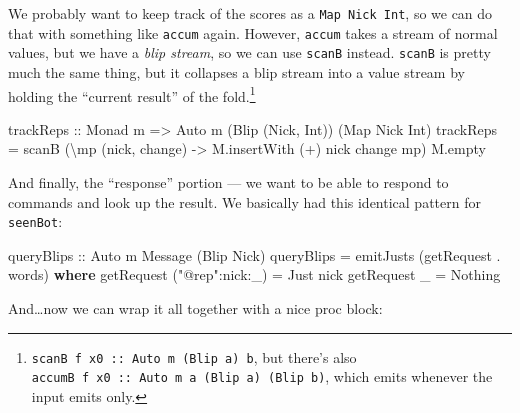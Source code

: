 \documentclass[]{article}
\newenvironment{Shaded}{\begin{snugshade}}{\end{snugshade}}
\newcommand{\DataTypeTok}[1]{\textcolor[rgb]{0.13,0.29,0.53}{#1}}
\newcommand{\FunctionTok}[1]{\textcolor[rgb]{0.00,0.00,0.00}{#1}}
\newcommand{\KeywordTok}[1]{\textcolor[rgb]{0.13,0.29,0.53}{\textbf{#1}}}
\newcommand{\NormalTok}[1]{#1}
\newcommand{\OtherTok}[1]{\textcolor[rgb]{0.56,0.35,0.01}{#1}}
\newcommand{\StringTok}[1]{\textcolor[rgb]{0.31,0.60,0.02}{#1}}
\begin{document}
We probably want to keep track of the scores as a \texttt{Map\ Nick\ Int}, so we
can do that with something like \texttt{accum} again. However, \texttt{accum}
takes a stream of normal values, but we have a \emph{blip stream}, so we can use
\texttt{scanB} instead. \texttt{scanB} is pretty much the same thing, but it
collapses a blip stream into a value stream by holding the ``current result'' of
the fold.\footnote{\texttt{scanB\ f\ x0\ ::\ Auto\ m\ (Blip\ a)\ b}, but there's
  also \texttt{accumB\ f\ x0\ ::\ Auto\ m\ a\ (Blip\ a)\ (Blip\ b)}, which emits
  whenever the input emits only.}

\begin{Shaded}
\begin{Highlighting}[]
\OtherTok{trackReps ::} \DataTypeTok{Monad}\NormalTok{ m }\OtherTok{=>} \DataTypeTok{Auto}\NormalTok{ m (}\DataTypeTok{Blip}\NormalTok{ (}\DataTypeTok{Nick}\NormalTok{, }\DataTypeTok{Int}\NormalTok{)) (}\DataTypeTok{Map} \DataTypeTok{Nick} \DataTypeTok{Int}\NormalTok{)}
\NormalTok{trackReps }\FunctionTok{=}\NormalTok{ scanB (\textbackslash{}mp (nick, change) }\OtherTok{->}\NormalTok{ M.insertWith (}\FunctionTok{+}\NormalTok{) nick change mp) M.empty}
\end{Highlighting}
\end{Shaded}

And finally, the ``response'' portion --- we want to be able to respond to
commands and look up the result. We basically had this identical pattern for
\texttt{seenBot}:

\begin{Shaded}
\begin{Highlighting}[]
\OtherTok{queryBlips ::} \DataTypeTok{Auto}\NormalTok{ m }\DataTypeTok{Message}\NormalTok{ (}\DataTypeTok{Blip} \DataTypeTok{Nick}\NormalTok{)}
\NormalTok{queryBlips }\FunctionTok{=}\NormalTok{ emitJusts (getRequest }\FunctionTok{.}\NormalTok{ words)}
  \KeywordTok{where}
\NormalTok{    getRequest (}\StringTok{"@rep"}\FunctionTok{:}\NormalTok{nick}\FunctionTok{:}\NormalTok{_) }\FunctionTok{=} \DataTypeTok{Just}\NormalTok{ nick}
\NormalTok{    getRequest _                }\FunctionTok{=} \DataTypeTok{Nothing}
\end{Highlighting}
\end{Shaded}

And\ldots{}now we can wrap it all together with a nice proc block:
\end{document}
